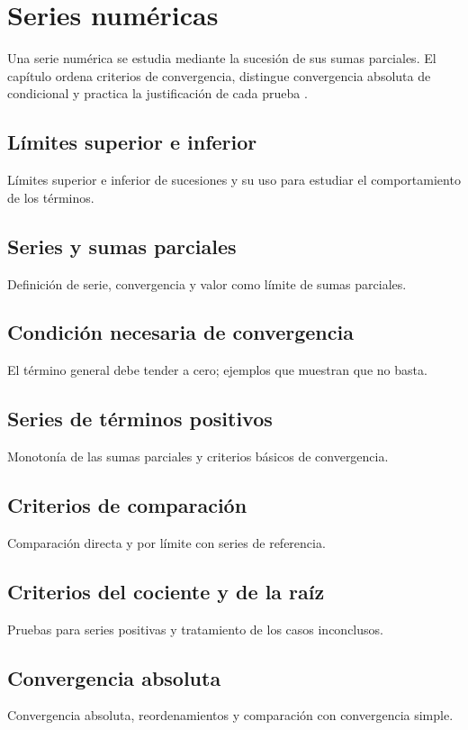 \chapter{Series numéricas}
\label{cap:series-numericas}

Una serie numérica se estudia mediante la sucesión de sus sumas parciales. El capítulo ordena criterios de convergencia, distingue convergencia absoluta de condicional y practica la justificación de cada prueba \cite{apostol1974,abbott2015,rudin1976}.

\section{Límites superior e inferior}
Límites superior e inferior de sucesiones y su uso para estudiar el comportamiento de los términos.

\section{Series y sumas parciales}
Definición de serie, convergencia y valor como límite de sumas parciales.

\section{Condición necesaria de convergencia}
El término general debe tender a cero; ejemplos que muestran que no basta.

\section{Series de términos positivos}
Monotonía de las sumas parciales y criterios básicos de convergencia.

\section{Criterios de comparación}
Comparación directa y por límite con series de referencia.

\section{Criterios del cociente y de la raíz}
Pruebas para series positivas y tratamiento de los casos inconclusos.

\section{Convergencia absoluta}
Convergencia absoluta, reordenamientos y comparación con convergencia simple.

